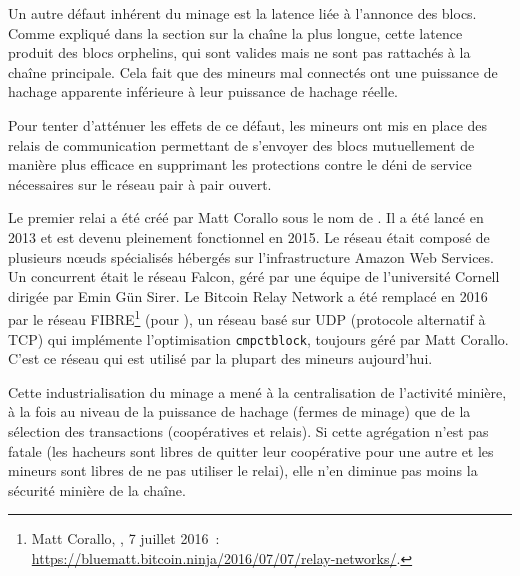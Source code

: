 
Un autre défaut inhérent du minage est la latence liée à l'annonce des blocs. Comme expliqué dans la section sur la chaîne la plus longue, cette latence produit des blocs orphelins, qui sont valides mais ne sont pas rattachés à la chaîne principale. Cela fait que des mineurs mal connectés ont une puissance de hachage apparente inférieure à leur puissance de hachage réelle.

Pour tenter d'atténuer les effets de ce défaut, les mineurs ont mis en place des relais de communication permettant de s'envoyer des blocs mutuellement de manière plus efficace en supprimant les protections contre le déni de service nécessaires sur le réseau pair à pair ouvert.

Le premier relai a été créé par Matt Corallo sous le nom de . Il a été lancé en 2013 et est devenu pleinement fonctionnel en 2015. Le réseau était composé de plusieurs nœuds spécialisés hébergés sur l'infrastructure Amazon Web Services. Un concurrent était le réseau Falcon, géré par une équipe de l'université Cornell dirigée par Emin Gün Sirer. Le Bitcoin Relay Network a été remplacé en 2016 par le réseau FIBRE\footnote{Matt Corallo, , 7 juillet 2016~: \url{https://bluematt.bitcoin.ninja/2016/07/07/relay-networks/}.} (pour ), un réseau basé sur UDP (protocole alternatif à TCP) qui implémente l'optimisation \texttt{cmpctblock}, toujours géré par Matt Corallo. C'est ce réseau qui est utilisé par la plupart des mineurs aujourd'hui.


Cette industrialisation du minage a mené à la centralisation de l'activité minière, à la fois au niveau de la puissance de hachage (fermes de minage) que de la sélection des transactions (coopératives et relais). Si cette agrégation n'est pas fatale (les hacheurs sont libres de quitter leur coopérative pour une autre et les mineurs sont libres de ne pas utiliser le relai), elle n'en diminue pas moins la sécurité minière de la chaîne.

